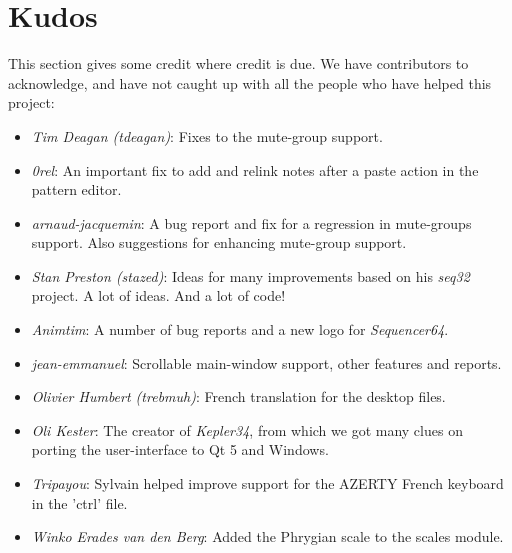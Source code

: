 %
%
%

\section{Kudos}
\label{sec:kudos}

   This section gives some credit where credit is due.
   We have contributors to acknowledge, and have not caught up with all the
   people who have helped this project:

   \begin{itemize}
      \item \textsl{Tim Deagan (tdeagan)}:
         Fixes to the mute-group support.
      \item \textsl{0rel}:
         An important fix to add and relink notes after a
         paste action in the pattern editor.
      \item \textsl{arnaud-jacquemin}:
         A bug report and fix for a regression in mute-groups support.
         Also suggestions for enhancing mute-group support.
      \item \textsl{Stan Preston (stazed)}:
         Ideas for many improvements based
         on his \textsl{seq32} project.  A lot of ideas.
         And a lot of code!
      \item \textsl{Animtim}:
         A number of bug reports and a new logo for \textsl{Sequencer64}.
      \item \textsl{jean-emmanuel}:
         Scrollable main-window support, other features and reports.
      \item \textsl{Olivier Humbert (trebmuh)}:
         French translation for the desktop files.
      \item \textsl{Oli Kester}:
         The creator of \textsl{Kepler34}, from which we got many
         clues on porting the user-interface to Qt 5 and Windows.
      \item \textsl{Tripayou}:
         Sylvain helped improve support for the AZERTY French keyboard in the
         'ctrl' file.
      \item \textsl{Winko Erades van den Berg}:
         Added the Phrygian scale to the scales module.
   \end{itemize}

